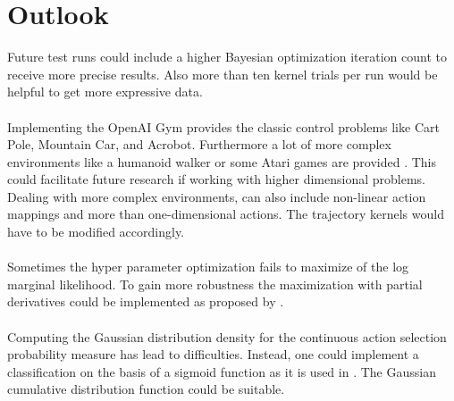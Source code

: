 \chapter{Outlook}
\label{chap:7}

Future test runs could include a higher Bayesian optimization iteration count to receive more precise results. Also more than ten kernel trials per run would be helpful to get more expressive data.\\
\\
Implementing the OpenAI Gym provides the classic control problems like Cart Pole, Mountain Car, and Acrobot. Furthermore a lot of more complex environments like a humanoid walker or some Atari games are provided \cite{DBLP:journals/corr/BrockmanCPSSTZ16}. This could facilitate future research if working with higher dimensional problems.\\
Dealing with more complex environments, can also include non-linear action mappings and more than one-dimensional actions. The trajectory kernels would have to be modified accordingly.\\
\\
Sometimes the hyper parameter optimization fails to maximize of the log marginal likelihood. To gain more robustness the maximization with partial derivatives could be implemented as proposed by \cite{rasmussen2006gaussian, lizotte2008practical}.\\
\\
Computing the Gaussian distribution density for the continuous action selection probability measure has lead to difficulties. Instead, one could implement a classification on the basis of a sigmoid function as it is used in \cite{rasmussen2006gaussian}. The Gaussian cumulative distribution function could be suitable.\\
\\
